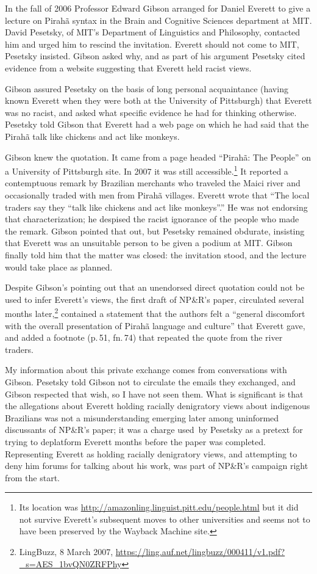 \documentclass[output=paper,colorlinks,citecolor=brown
]{langscibook}
\begin{document}
In the fall of 2006 Professor Edward Gibson arranged for Daniel
Everett to give a lecture on Pirah{\~a} syntax in the Brain and
Cognitive Sciences department at MIT. David Pesetsky, of MIT's
Department of Linguistics and Philosophy, contacted him and
urged him to rescind the invitation. Everett should not come to
MIT, Pesetsky insisted. Gibson asked why, and as part of his argument
Pesetsky cited evidence from a website suggesting that Everett held
racist views.

Gibson assured Pesetsky on the basis of long personal acquaintance
(having known Everett when they were both at the University of
Pittsburgh) that Everett was no racist, and asked what specific
evidence he had for thinking otherwise. Pesetsky told Gibson that
Everett had a web page on which he had said that the Pirah{\~a}
talk like chickens and act like monkeys.

Gibson knew the quotation. It came from a page headed ``Pirah{\~a}:
The People'' on a University of Pittsburgh site. In 2007 it was still
accessible.\footnote{%
  Its location was \url{http://amazonling.linguist.pitt.edu/people.html}
  but it did not survive Everett's subsequent moves to other universities
  and seems not to have been preserved by the Wayback Machine site.}
It reported a contemptuous remark by Brazilian merchants who traveled
the Maici river and occasionally traded with men from Pirah{\~a} villages.
Everett wrote that ``The local traders say they ``talk like chickens and
act like monkeys''.'' He was not endorsing that characterization; he
despised the racist ignorance of the people who made the remark. Gibson
pointed that out, but Pesetsky remained obdurate, insisting that Everett
was an unsuitable person to be given a podium at MIT. Gibson finally
told him that the matter was closed: the invitation stood, and the
lecture would take place as planned.

Despite Gibson's pointing out that an unendorsed direct quotation could
not be used to infer Everett's views, the first draft of NP\&R's paper,
circulated several months later,\footnote{%
   LingBuzz, 8 March 2007,
   \url{https://ling.auf.net/lingbuzz/000411/v1.pdf?_s=AES_1bvQN0ZRFPhy}}
contained a statement that the authors felt a ``general discomfort with
the overall presentation of Pirahã language and culture'' that Everett
gave, and added a footnote (p.\,51, fn.\,74) that repeated the quote
from the river traders.

My information about this private exchange comes from conversations with
Gibson. Pesetsky told Gibson not to circulate the emails they exchanged,
and Gibson respected that wish, so I have not seen them. What is
significant is that the allegations about Everett holding racially
denigratory views about indigenous Brazilians was not a misunderstanding
emerging later among uninformed discussants of NP\&R's paper; it was a
charge used by Pesetsky as a pretext for trying to deplatform Everett
months before the paper was completed. Representing Everett as holding
racially denigratory views, and attempting to deny him forums for talking
about his work, was part of NP\&R’s campaign right from the start.
\end{document}
